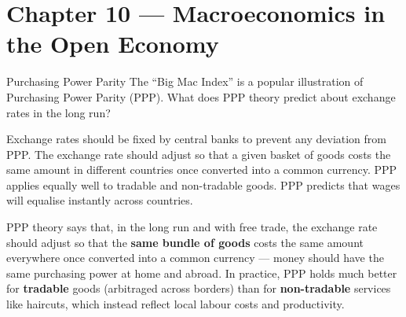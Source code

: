 \section{Chapter 10 — Macroeconomics in the Open Economy}

\begin{question}[type=mc]{Purchasing Power Parity}
The ``Big Mac Index'' is a popular illustration of Purchasing Power Parity
(PPP). What does PPP theory predict about exchange rates in the long run?
\begin{choices}
  \choice        Exchange rates should be fixed by central banks to prevent
                 any deviation from PPP.
  \correctchoice The exchange rate should adjust so that a given basket of
                 goods costs the same amount in different countries once
                 converted into a common currency.
  \choice        PPP applies equally well to tradable and non-tradable goods.
  \choice        PPP predicts that wages will equalise instantly across
                 countries.
\end{choices}
\begin{solution}
  PPP theory says that, in the long run and with free trade, the exchange
  rate should adjust so that the \textbf{same bundle of goods} costs the
  same amount everywhere once converted into a common currency --- money
  should have the same purchasing power at home and abroad. In practice, PPP
  holds much better for \textbf{tradable} goods (arbitraged across borders)
  than for \textbf{non-tradable} services like haircuts, which instead
  reflect local labour costs and productivity.
\end{solution}
\end{question}

